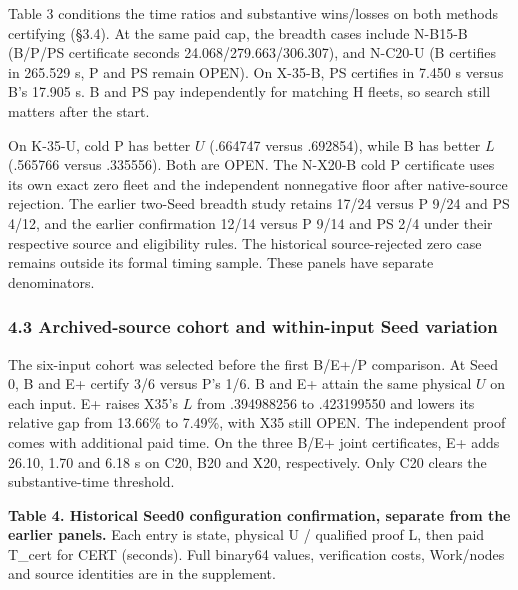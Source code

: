 \documentclass[
  american,
  11pt,
]{article}
\begin{document}
Table 3 conditions the time ratios and substantive wins/losses on both
methods certifying (§3.4). At the same paid cap, the breadth cases
include N-B15-B (B/P/PS certificate seconds 24.068/279.663/306.307), and
N-C20-U (B certifies in 265.529 s, P and PS remain OPEN). On X-35-B, PS
certifies in 7.450 s versus B's 17.905 s. B and PS pay independently for
matching H fleets, so search still matters after the start.

On K-35-U, cold P has better \(U\) (.664747 versus .692854), while B has
better \(L\) (.565766 versus .335556). Both are OPEN. The N-X20-B cold P
certificate uses its own exact zero fleet and the independent
nonnegative floor after native-source rejection. The earlier two-Seed
breadth study retains 17/24 versus P 9/24 and PS 4/12, and the earlier
confirmation 12/14 versus P 9/14 and PS 2/4 under their respective
source and eligibility rules. The historical source-rejected zero case
remains outside its formal timing sample. These panels have separate
denominators.

\subsubsection{4.3 Archived-source cohort and within-input Seed
variation}\label{archived-source-cohort-and-within-input-seed-variation}

The six-input cohort was selected before the first B/E+/P comparison. At
Seed 0, B and E+ certify 3/6 versus P's 1/6. B and E+ attain the same
physical \(U\) on each input. E+ raises X35's \(L\) from .394988256 to
.423199550 and lowers its relative gap from 13.66\% to 7.49\%, with X35
still OPEN. The independent proof comes with additional paid time. On
the three B/E+ joint certificates, E+ adds 26.10, 1.70 and 6.18 s on
C20, B20 and X20, respectively. Only C20 clears the substantive-time
threshold.

\textbf{Table 4. Historical Seed0 configuration confirmation, separate
from the earlier panels.} Each entry is state, physical U / qualified
proof L, then paid T\_\allowbreak{}cert for CERT (seconds). Full binary64 values,
verification costs, Work/nodes and source identities are in the
supplement.
\end{document}

